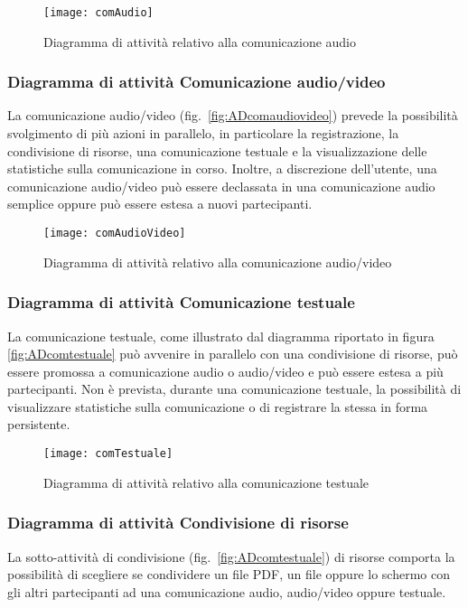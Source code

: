 \begin{figure}[H]
  \centering
  \texttt{[image: comAudio]}
  \caption{Diagramma di attività relativo alla comunicazione audio}\label{fig:ADcomaudio}
\end{figure}

\subsubsection{Diagramma di attività Comunicazione audio/video}
La comunicazione audio/video (fig.~\vref{fig:ADcomaudiovideo}) prevede la possibilità svolgimento di più azioni in parallelo, in particolare la registrazione, la condivisione di risorse, una comunicazione testuale e la visualizzazione delle statistiche sulla comunicazione in corso. Inoltre, a discrezione dell'utente, una comunicazione audio/video può essere declassata in una comunicazione audio semplice oppure può essere estesa a nuovi partecipanti.

\begin{figure}[H]
  \centering
  \texttt{[image: comAudioVideo]}
  \caption{Diagramma di attività relativo alla comunicazione audio/video}\label{fig:ADcomaudiovideo}
\end{figure}

\subsubsection{Diagramma di attività Comunicazione testuale}
La comunicazione testuale, come illustrato dal diagramma riportato in figura \vref{fig:ADcomtestuale} può avvenire in parallelo con una condivisione di risorse, può essere promossa a comunicazione audio o audio/video e può essere estesa a più partecipanti. Non è prevista, durante una comunicazione testuale, la possibilità di visualizzare statistiche sulla comunicazione o di registrare la stessa in forma persistente.

\begin{figure}[H]
  \centering
  \texttt{[image: comTestuale]}
  \caption{Diagramma di attività relativo alla comunicazione testuale}\label{fig:ADcomtestuale}
\end{figure}

\subsubsection{Diagramma di attività Condivisione di risorse}
La sotto-attività di condivisione (fig.~\vref{fig:ADcomtestuale}) di risorse comporta la possibilità di scegliere se condividere un file PDF, un file oppure lo schermo con gli altri partecipanti ad una comunicazione audio, audio/video oppure testuale.


